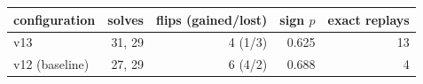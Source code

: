 \begin{tabular}{lrrrr}
\toprule
configuration & solves & flips (gained/lost) & sign $p$ & exact replays \\
\midrule
v13 & 31, 29 & 4 (1/3) & 0.625 & 13 \\
v12 (baseline) & 27, 29 & 6 (4/2) & 0.688 & 4 \\
\bottomrule
\end{tabular}
